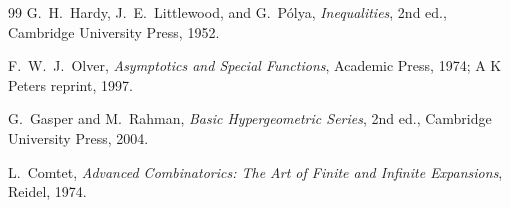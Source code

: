 \documentclass[11pt,a4paper]{article}
\theoremstyle{definition}
\newcommand{\1}{\mathbf{1}}
\begin{document}
\begin{thebibliography}{99}
G.~H.~Hardy, J.~E.~Littlewood, and G.~P\'olya,
\newblock \emph{Inequalities},
\newblock 2nd ed., Cambridge University Press, 1952.

F.~W.~J.~Olver,
\newblock \emph{Asymptotics and Special Functions},
\newblock Academic Press, 1974; A K Peters reprint, 1997.

G.~Gasper and M.~Rahman,
\newblock \emph{Basic Hypergeometric Series},
\newblock 2nd ed., Cambridge University Press, 2004.

L.~Comtet,
\newblock \emph{Advanced Combinatorics: The Art of Finite and Infinite
Expansions},
\newblock Reidel, 1974.

\end{thebibliography}
\end{document}
